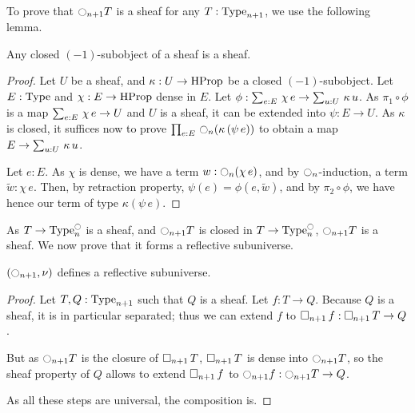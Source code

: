 To prove that $\ocircle_{n+1} T$ is a sheaf for any $T:\operatorname{Type}_{n+1}$, we
use the following lemma.
\begin{lem}
  Any closed $(-1)$-subobject of a sheaf is a sheaf.
\end{lem}
\begin{proof}
  Let $U$ be a sheaf, and $\kappa:U\to \operatorname{HProp}$ be a closed
  $(-1)$-subobject. 
  Let $E:\operatorname{Type}$ and
  $\chi:E\to\operatorname{HProp}$ dense in $E$. Let $\phi:\sum_{e:E}\, \chi\, e \to
  \sum_{u:U}\, \kappa\, u$. As $\pi_1 \circ \phi$ is a map $\sum_{e:E}\, \chi\, e \to U$ and $U$ is a sheaf, it can be extended into
  $\psi:E\to U$. As $\kappa$ is closed, it suffices now to prove
  $\prod_{e:E}\, \ocircle_n(\kappa\, (\psi\, e))$ to obtain a map
  $E\to\sum_{u:U}\, \kappa\, u$.

  Let $e:E$. As $\chi$ is dense, we have a term $w:\ocircle_n(\chi\,e)$,
  and by $\ocircle_n$-induction, a term $\widetilde w:\chi\, e$.
  Then, by retraction property, $\psi(e) = \phi(e,\widetilde w)$, and by $\pi_2
  \circ \phi$, we have hence our term of type $\kappa(\psi\, e)$.




\end{proof}
As $T\to \operatorname{Type}_n^{\ocircle}$ is a sheaf, and $\ocircle_{n+1}T$ is closed in
$T\to \operatorname{Type}_n^{\ocircle}$, $\ocircle_{n+1}T$ is a sheaf. We now prove that
it forms a reflective subuniverse.

\begin{prop}
  $(\ocircle_{n+1},\nu)$ defines a reflective subuniverse.
\end{prop}
\begin{proof}
  Let $T,Q:\operatorname{Type}_{n+1}$ such that $Q$ is a sheaf. Let $f:T\to Q$.
  Because $Q$ is a sheaf, it is in particular separated;
  thus we can extend $f$ to $\mathop{\square_{n+1}} f:\mathop{\square_{n+1}} T\to Q$.

  But as $\ocircle_{n+1} T$ is the closure of $\mathop{\square_{n+1}} T$, $\mathop{\square_{n+1}} T$ is dense
  into $\ocircle_{n+1} T$, so the sheaf property of $Q$ allows to extend
  $\mathop{\square_{n+1}} f$ to $\ocircle_{n+1} f:\ocircle_{n+1} T \to Q$.

  As all these steps are universal, the composition is.
\end{proof}

